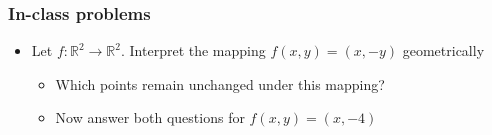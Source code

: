 \documentclass{beamer}
\numberwithin{equation}{section}
\begin{document}
\begin{frame}
\frametitle{In-class problems}

\begin{itemize}
\item[3.4.1] Let $f:\mathbb{R}^2\rightarrow \mathbb{R}^2$. Interpret the mapping $f(x, y)=(x, -y)$ geometrically
\begin{itemize}

\item Which points remain unchanged under this mapping? %

\item Now answer both questions for $f(x, y)=(x, -4)$ %

\end{itemize}
\end{itemize}

\end{frame}
\end{document}
